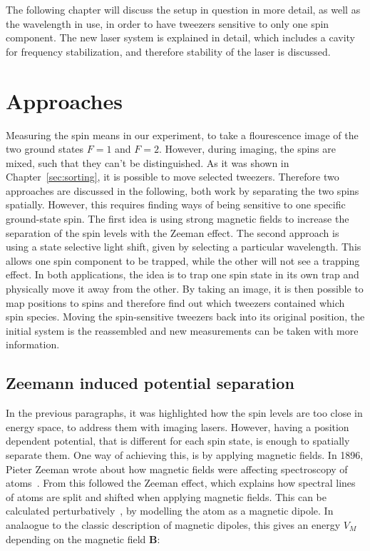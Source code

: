 The following chapter will discuss the setup in question in more detail, as well as the wavelength in use, in order to have tweezers sensitive to only one spin component. The new laser system is explained in detail, which includes a cavity for frequency stabilization, and therefore stability of the laser is discussed.

\section{Approaches}

Measuring the spin means in our experiment, to take a flourescence image of the two ground states $F=1$ and $F=2$. However, during imaging, the spins are mixed, such that they can't be distinguished. As it was shown in Chapter~\ref{sec:sorting}, it is possible to move selected tweezers. Therefore two approaches are discussed in the following, both work by separating the two spins spatially. However, this requires finding ways of being sensitive to one specific ground-state spin. The first idea is using strong magnetic fields to increase the separation of the spin levels with the Zeeman effect. The second approach is using a state selective light shift, given by selecting a particular wavelength. This allows one spin component to be trapped, while the other will not see a trapping effect. In both applications, the idea is to trap one spin state in its own trap and physically move it away from the other. By taking an image, it is then possible to map positions to spins and therefore find out which tweezers contained which spin species. Moving the spin-sensitive tweezers back into its original position, the initial system is the reassembled and new measurements can be taken with more information.

\subsection{Zeemann induced potential separation}

In the previous paragraphs, it was highlighted how the spin levels are too close in energy space, to address them  with imaging lasers. However, having a position dependent potential, that is different for each spin state, is enough to spatially separate them. One way of achieving this, is by applying magnetic fields. In 1896, Pieter Zeeman wrote about how magnetic fields were affecting spectroscopy of atoms~\cite{Zeeman1896}. From this followed the Zeeman effect, which explains how spectral lines of atoms are split and shifted when applying magnetic fields. This can be calculated perturbatively~\cite{Griffiths2004}, by modelling the atom as a magnetic dipole. In analaogue to the classic description of magnetic dipoles, this gives an energy $V_M$ depending on the magnetic field $\bm{B}$:

